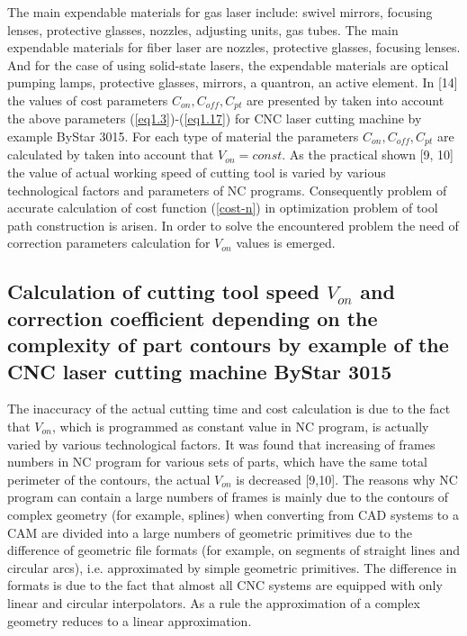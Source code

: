 \documentclass[runningheads]{llncs}
\begin{document}
The main expendable materials for gas laser include:
swivel mirrors, focusing lenses, protective glasses, nozzles, adjusting units, gas tubes.
The main expendable materials for fiber laser are nozzles, protective glasses, focusing lenses.
And for the case of using solid-state lasers,
the expendable materials are
optical pumping lamps, protective glasses, mirrors, a quantron, an active element.
In [14] the values of cost parameters
$C_{on}, C_{off}, C_{pt}$
are presented by taken into account the above parameters (\ref{eq1.3})-(\ref{eq1.17})
for CNC laser cutting machine by example ByStar 3015.
For each type of material the parameters $C_{on}, C_{off}, C_{pt}$
are calculated by taken into account that
$V_{on}=const$.
As the practical shown [9, 10]
the value of actual working speed of cutting tool
is varied by various technological factors and parameters of NC programs.
Consequently problem of accurate calculation of cost function (\ref{cost-n})
in optimization problem of tool path construction is arisen.
In order to solve the encountered problem
the need of correction parameters calculation for $V_{on}$
values is emerged.

\subsection{Calculation of cutting tool speed $V_{on}$
and correction coefficient depending on the complexity of
part contours by example of the CNC laser cutting machine ByStar 3015}

The inaccuracy of the actual cutting time and cost calculation is due to the fact that $V_{on}$,
which is programmed as constant value in NC program,
is actually varied by various technological factors.
It was found that increasing of frames numbers in NC program
for various sets of parts,
which have the same total perimeter of the contours,
the actual $V_{on}$ is decreased [9,10].
The reasons why NC program can contain a large numbers of frames
is mainly due to the contours of complex geometry (for example, splines)
when converting from CAD systems to a CAM
are divided into a large numbers of geometric primitives
due to the difference of geometric file formats
(for example, on segments of straight lines and circular arcs),
i.e. approximated by simple geometric primitives.
The difference in formats is due to the fact that
almost all CNC systems are equipped with only linear and circular interpolators.
As a rule the approximation of a complex geometry reduces to a linear approximation.
\end{document}

